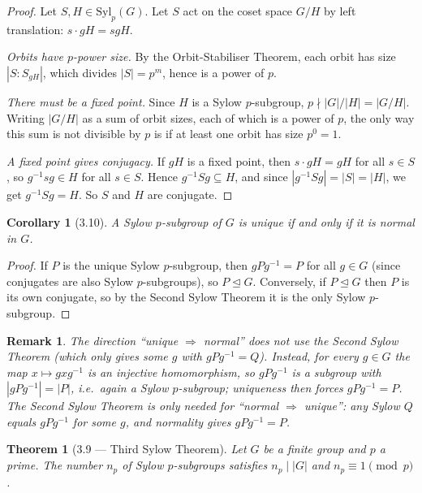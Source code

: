 \documentclass[12pt]{article}
\newtheorem{theorem}{Theorem}
\newtheorem{corollary}{Corollary}
\newtheorem{remark}{Remark}
\begin{document}
\begin{proof}
Let $S, H \in \mathrm{Syl}_p(G)$. Let $S$ act on the coset space $G/H$ by left translation: $s \cdot gH = sgH$.

\textit{Orbits have $p$-power size.} By the Orbit-Stabiliser Theorem, each orbit has size $|S : S_{gH}|$, which divides $|S| = p^m$, hence is a power of $p$.

\textit{There must be a fixed point.} Since $H$ is a Sylow $p$-subgroup, $p \nmid |G|/|H| = |G/H|$. Writing $|G/H|$ as a sum of orbit sizes, each of which is a power of $p$, the only way this sum is not divisible by $p$ is if at least one orbit has size $p^0 = 1$.

\textit{A fixed point gives conjugacy.} If $gH$ is a fixed point, then $s \cdot gH = gH$ for all $s \in S$, so $g^{-1}sg \in H$ for all $s \in S$. Hence $g^{-1}Sg \subseteq H$, and since $|g^{-1}Sg| = |S| = |H|$, we get $g^{-1}Sg = H$. So $S$ and $H$ are conjugate.
\end{proof}


\begin{corollary}[3.10]
A Sylow $p$-subgroup of $G$ is unique if and only if it is normal in $G$.
\end{corollary}

\begin{proof}
If $P$ is the unique Sylow $p$-subgroup, then $gPg^{-1} = P$ for all $g \in G$ (since conjugates are also Sylow $p$-subgroups), so $P \trianglelefteq G$. Conversely, if $P \trianglelefteq G$ then $P$ is its own conjugate, so by the Second Sylow Theorem it is the only Sylow $p$-subgroup.
\end{proof}

\begin{remark}
The direction ``unique $\Rightarrow$ normal'' does \emph{not} use the Second Sylow Theorem (which only gives \emph{some} $g$ with $gPg^{-1} = Q$). Instead, for \emph{every} $g \in G$ the map $x \mapsto gxg^{-1}$ is an injective homomorphism, so $gPg^{-1}$ is a subgroup with $|gPg^{-1}| = |P|$, i.e.\ again a Sylow $p$-subgroup; uniqueness then forces $gPg^{-1} = P$. The Second Sylow Theorem is only needed for ``normal $\Rightarrow$ unique'': any Sylow $Q$ equals $gPg^{-1}$ for some $g$, and normality gives $gPg^{-1} = P$.
\end{remark}

\begin{theorem}[3.9 — Third Sylow Theorem]
Let $G$ be a finite group and $p$ a prime. The number $n_p$ of Sylow $p$-subgroups satisfies $n_p \mid |G|$ and $n_p \equiv 1 \pmod{p}$.
\end{theorem}
\end{document}
